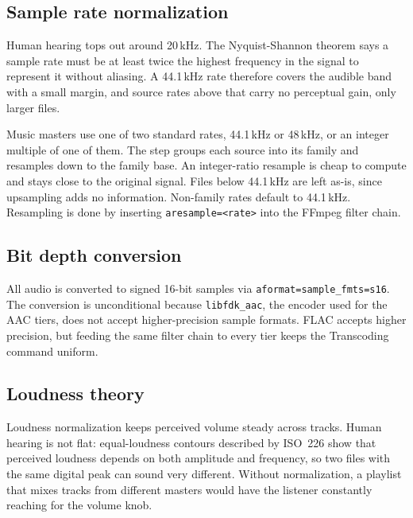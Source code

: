 \documentclass[a4paper,11pt]{article}
\begin{document}
\subsection{Sample rate normalization}
Human hearing tops out around 20\,kHz. The Nyquist-Shannon theorem
says a sample rate must be at least twice the highest frequency in the
signal to represent it without aliasing. A 44.1\,kHz rate therefore
covers the audible band with a small margin, and source rates above
that carry no perceptual gain, only larger files.

Music masters use one of two standard rates, 44.1\,kHz or 48\,kHz, or
an integer multiple of one of them. The step groups each source into
its family and resamples down to the family base. An integer-ratio
resample is cheap to compute and stays close to the original signal.
Files below 44.1\,kHz are left as-is, since upsampling adds no
information. Non-family rates default to 44.1\,kHz. Resampling is done
by inserting \texttt{aresample=<rate>} into the FFmpeg filter chain.

\subsection{Bit depth conversion}
All audio is converted to signed 16-bit samples via
\texttt{aformat=sample\_fmts=s16}. The conversion is unconditional
because \texttt{libfdk\_aac}, the encoder used for the AAC tiers, does
not accept higher-precision sample formats. FLAC accepts higher
precision, but feeding the same filter chain to every tier keeps the
Transcoding command uniform.

\subsection{Loudness theory}
Loudness normalization keeps perceived volume steady across tracks.
Human hearing is not flat: equal-loudness contours described by
ISO~226 show that perceived loudness depends on both amplitude and
frequency, so two files with the same digital peak can sound very
different. Without normalization, a playlist that mixes tracks from
different masters would have the listener constantly reaching for the
volume knob.
\end{document}

